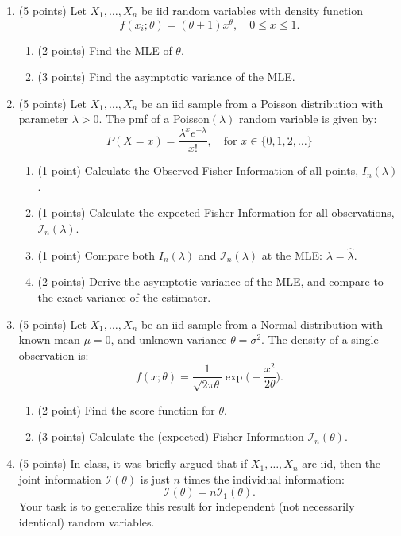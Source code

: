 \documentclass[10pt,twoside]{article}\usepackage[]{graphicx}\usepackage[dvipsnames,svgnames,table]{xcolor}
\begin{document}
\begin{enumerate}

  \item (5 points) Let $X_1,\ldots, X_n$ be iid random variables with density function
  $$
  f(x_i; \theta) = (\theta + 1)x^\theta, \quad 0 \leq x \leq 1.
  $$

  \begin{enumerate}
    \item (2 points) Find the MLE of $\theta$.
    \item (3 points) Find the asymptotic variance of the MLE.
  \end{enumerate}


  \item (5 points) Let $X_1, \ldots, X_n$ be an iid sample from a Poisson distribution with parameter $\lambda > 0$. The pmf of a Poisson$(\lambda)$ random variable is given by:
  $$
  P(X = x) = \frac{\lambda^xe^{-\lambda}}{x!}, \quad \text{for } x \in \{0, 1, 2, \ldots\}
  $$

\begin{enumerate}
  \item (1 point) Calculate the Observed Fisher Information of all points, $I_n(\lambda)$.
  \item (1 points) Calculate the expected Fisher Information for all observations, $\mathcal{I}_n(\lambda)$.

  \item (1 point) Compare both $I_n(\lambda)$ and $\mathcal{I}_n(\lambda)$ at the MLE: $\lambda = \hat{\lambda}$.
  \item (2 points) Derive the asymptotic variance of the MLE, and compare to the exact variance of the estimator.
\end{enumerate}

\item (5 points) Let $X_1, \ldots, X_n$ be an iid sample from a Normal distribution with known mean $\mu = 0$, and unknown variance $\theta = \sigma^2$. The density of a single observation is:
$$
f(x; \theta) = \frac{1}{\sqrt{2\pi\theta}} \exp\Big(-\frac{x^2}{2\theta}\Big).
$$

\begin{enumerate}
  \item (2 point) Find the score function for $\theta$.
  \item (3 points) Calculate the (expected) Fisher Information $\mathcal{I}_n(\theta)$.
\end{enumerate}

\item (5 points) In class, it was briefly argued that if $X_1, \ldots, X_n$ are iid, then the joint information $\mathcal{I}(\theta)$ is just $n$ times the individual information:
$$
\mathcal{I}(\theta) = n\mathcal{I}_1(\theta).
$$
Your task is to generalize this result for independent (not necessarily identical) random variables.


\end{enumerate}
\end{document}
